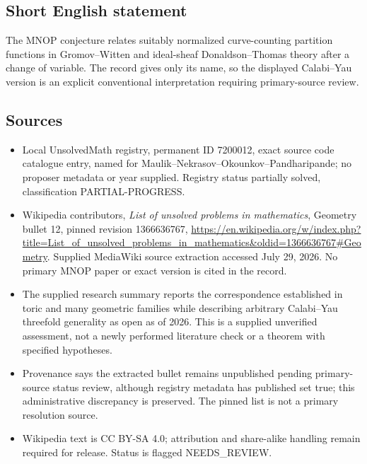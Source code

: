 \documentclass[11pt]{article}
\begin{document}
\subsection{Short English statement}
The MNOP conjecture relates suitably normalized curve-counting partition functions in Gromov--Witten and ideal-sheaf Donaldson--Thomas theory after a change of variable. The record gives only its name, so the displayed Calabi--Yau version is an explicit conventional interpretation requiring primary-source review.
\subsection{Sources}
\begin{itemize}
\item Local UnsolvedMath registry, permanent ID 7200012, exact source code catalogue entry, named for Maulik--Nekrasov--Okounkov--Pandharipande; no proposer metadata or year supplied. Registry status partially solved, classification PARTIAL-PROGRESS.
\item Wikipedia contributors, \emph{List of unsolved problems in mathematics}, Geometry bullet 12, pinned revision 1366636767, \url{https://en.wikipedia.org/w/index.php?title=List_of_unsolved_problems_in_mathematics&oldid=1366636767#Geometry}. Supplied MediaWiki source extraction accessed July 29, 2026. No primary MNOP paper or exact version is cited in the record.
\item The supplied research summary reports the correspondence established in toric and many geometric families while describing arbitrary Calabi--Yau threefold generality as open as of 2026. This is a supplied unverified assessment, not a newly performed literature check or a theorem with specified hypotheses.
\item Provenance says the extracted bullet remains unpublished pending primary-source status review, although registry metadata has published set true; this administrative discrepancy is preserved. The pinned list is not a primary resolution source.
\item Wikipedia text is CC BY-SA 4.0; attribution and share-alike handling remain required for release. Status is flagged NEEDS\_REVIEW.
\end{itemize}
\end{document}
